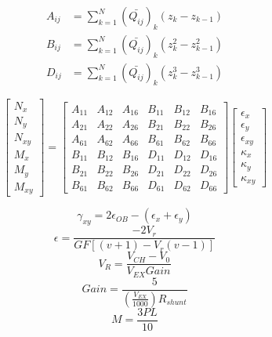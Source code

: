 \documentclass[12pt]{article}
\begin{document}
\begin{align}
A_{ij}&=\sum_{k=1}^{N}\left(\bar{Q_{ij}}\right)_k(z_{k}-z_{k-1})\\
B_{ij}&=\sum_{k=1}^{N}\left(\bar{Q_{ij}}\right)_k(z_{k}^2-z_{k-1}^2)\\
D_{ij}&=\sum_{k=1}^{N}\left(\bar{Q_{ij}}\right)_k(z_{k}^3-z_{k-1}^3)
\end{align}

\begin{equation}
\left[\begin{matrix}
N_{x}\\ N_{y} \\ N_{xy} \\ M_{x} \\ M_{y} \\ M_{xy}
\end{matrix}\right] 
= \left[ \begin{matrix}
A_{11} & A_{12} & A_{16} & B_{11} & B_{12} & B_{16} \\ 
A_{21} & A_{22} & A_{26} & B_{21} & B_{22} & B_{26} \\
A_{61} & A_{62} & A_{66} & B_{61} & B_{62} & B_{66} \\
B_{11} & B_{12} & B_{16} & D_{11} & D_{12} & D_{16} \\
B_{21} & B_{22} & B_{26} & D_{21} & D_{22} & D_{26} \\
B_{61} & B_{62} & B_{66} & D_{61} & D_{62} & D_{66} 
\end{matrix} \right] \left[\begin{matrix}
\epsilon_{x}\\ \epsilon_{y} \\ \epsilon_{xy} \\ \kappa_{x} \\ \kappa_{y} \\ \kappa_{xy} 
\end{matrix} \right]
\end{equation}

 \begin{equation}
 \gamma_{xy} = 2\epsilon_{OB} -(\epsilon_{x}+\epsilon_{y})\label{eq:45Rosette}
\end{equation}
\begin{equation}
\epsilon =\frac{-2V_{r}}{GF[(v+1)-V_{r}(v - 1)]}\label{eq:Ve}
\end{equation}
\begin{equation}
V_{R} = \frac{V_{CH}-V_{0}}{V_{EX} Gain}\label{eq:Vr}
\end{equation}
\begin{equation}
Gain = \frac{5}{(\frac{V_{EX}}{1000}){R_{shunt}}}\label{eq:gain}
\end{equation}
\begin{equation}
M = \frac{3PL}{10}\label{eq:moment}
\end{equation}




\end{document}
